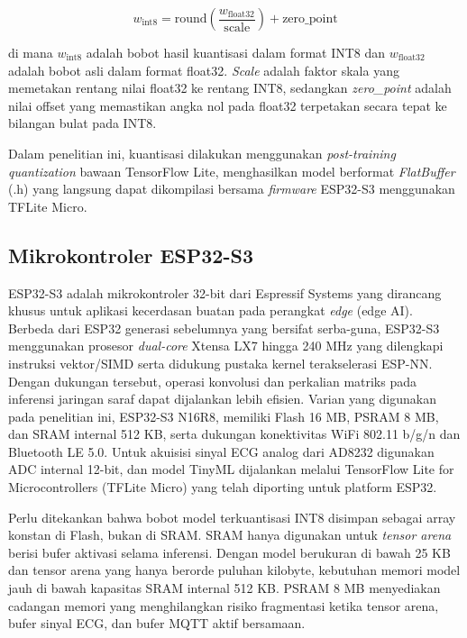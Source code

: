 \begin{equation}
\label{eq:kuantisasi}
w_\text{int8} = \text{round}\!\left(\frac{w_\text{float32}}{\text{scale}}\right)
+ \text{zero\_point}
\end{equation}

\noindent di mana $w_\text{int8}$ adalah bobot hasil kuantisasi dalam format
INT8 dan $w_\text{float32}$ adalah bobot asli dalam format float32.
\textit{Scale} adalah faktor skala yang memetakan rentang nilai float32 ke
rentang INT8, sedangkan \textit{zero\_point} adalah nilai offset yang memastikan
angka nol pada float32 terpetakan secara tepat ke bilangan bulat pada INT8.

Dalam penelitian ini, kuantisasi dilakukan menggunakan \textit{post-training
quantization} bawaan TensorFlow Lite, menghasilkan model berformat
\textit{FlatBuffer} (.h) yang langsung dapat dikompilasi bersama
\textit{firmware} ESP32-S3 menggunakan TFLite Micro.

\subsection{Mikrokontroler ESP32-S3}
\label{subsec:esp32}

ESP32-S3 adalah mikrokontroler 32-bit dari Espressif Systems yang dirancang khusus
untuk aplikasi kecerdasan buatan pada perangkat \emph{edge} (edge AI). Berbeda dari
ESP32 generasi sebelumnya yang bersifat serba-guna, ESP32-S3 menggunakan prosesor
\emph{dual-core} Xtensa LX7 hingga 240 MHz yang dilengkapi instruksi vektor/SIMD serta
didukung pustaka kernel terakselerasi ESP-NN. Dengan dukungan tersebut, operasi konvolusi
dan perkalian matriks pada inferensi jaringan saraf dapat dijalankan lebih efisien. Varian yang
digunakan pada penelitian ini, ESP32-S3 N16R8, memiliki Flash 16 MB, PSRAM 8 MB, dan
SRAM internal 512 KB, serta dukungan konektivitas WiFi 802.11 b/g/n dan Bluetooth LE
5.0. Untuk akuisisi sinyal ECG analog dari AD8232 digunakan ADC internal 12-bit, dan
model TinyML dijalankan melalui TensorFlow Lite for Microcontrollers (TFLite Micro)
yang telah diporting untuk platform ESP32.

Perlu ditekankan bahwa bobot model terkuantisasi INT8 disimpan sebagai array konstan di
Flash, bukan di SRAM. SRAM hanya digunakan untuk \emph{tensor arena} berisi bufer
aktivasi selama inferensi. Dengan model berukuran di bawah 25 KB dan tensor arena yang
hanya berorde puluhan kilobyte, kebutuhan memori model jauh di bawah kapasitas SRAM
internal 512 KB. PSRAM 8 MB menyediakan cadangan memori yang menghilangkan
risiko fragmentasi ketika tensor arena, bufer sinyal ECG, dan bufer MQTT aktif
bersamaan.

